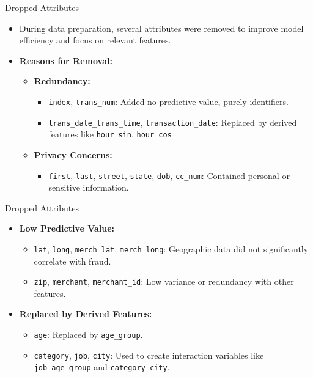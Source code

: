 \documentclass{beamer}
\begin{document}
\begin{frame}{Dropped Attributes}
    \begin{itemize}
        \item During data preparation, several attributes were removed to improve model efficiency and focus on relevant features.
        \item \textbf{Reasons for Removal:}
        \begin{itemize}
            \item \textbf{Redundancy:}
            \begin{itemize}
                \item \texttt{index}, \texttt{trans\_num}: Added no predictive value, purely identifiers.
                \item \texttt{trans\_date\_trans\_time}, \texttt{transaction\_date}: Replaced by derived features like \texttt{hour\_sin}, \texttt{hour\_cos}
            \end{itemize}
            \item \textbf{Privacy Concerns:}
            \begin{itemize}
                \item \texttt{first}, \texttt{last}, \texttt{street}, \texttt{state}, \texttt{dob}, \texttt{cc\_num}: Contained personal or sensitive information.
            \end{itemize}
        \end{itemize}
    \end{itemize}
\end{frame}

\begin{frame}{Dropped Attributes}
    \begin{itemize}
        \item \textbf{Low Predictive Value:}
        \begin{itemize}
            \item \texttt{lat}, \texttt{long}, \texttt{merch\_lat}, \texttt{merch\_long}: Geographic data did not significantly correlate with fraud.
            \item \texttt{zip}, \texttt{merchant}, \texttt{merchant\_id}: Low variance or redundancy with other features.
        \end{itemize}
        \item \textbf{Replaced by Derived Features:}
        \begin{itemize}
            \item \texttt{age}: Replaced by \texttt{age\_group}.
            \item \texttt{category}, \texttt{job}, \texttt{city}: Used to create interaction variables like \texttt{job\_age\_group} and \texttt{category\_city}.
    \end{itemize}
    \end{itemize}
\end{frame}
\end{document}
